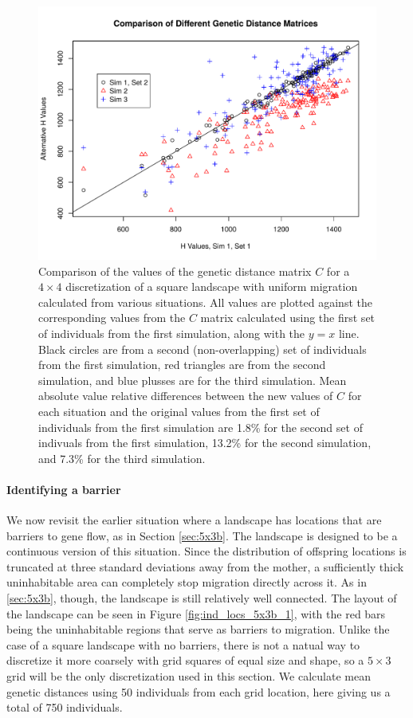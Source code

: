 \documentclass{article}
\begin{document}
\begin{figure}
\centering
\includegraphics[scale=.8]{figs/h_val_comp}
\caption{
    Comparison of the values of the genetic distance matrix $C$
    for a $4 \times 4$ discretization of a square landscape with uniform migration
    calculated from various situations.
    All values are plotted against the corresponding values from the $C$ matrix
    calculated using the first set of individuals from the first simulation,
    along with the $y=x$ line.
    Black circles are from a second (non-overlapping) set of individuals from the first simulation,
    red triangles are from the second simulation, 
    and blue plusses are for the third simulation.
    Mean absolute value relative differences between the new values of $C$ for each situation
    and the original values from the first set of individuals from the first simulation are
    1.8\% for the second set of indivuals from the first simulation,
    13.2\% for the second simulation, 
    and 7.3\% for the third simulation.
    } \label{fig:h_val_comp}
\end{figure}

\paragraph{Identifying a barrier}
We now revisit the earlier situation where a landscape has locations that are barriers to gene flow,
as in Section \ref{sec:5x3b}.
The landscape is designed to be a continuous version of this situation.
Since the distribution of offspring locations is truncated at three standard deviations
away from the mother, a sufficiently thick uninhabitable area can completely stop migration
directly across it.
As in \ref{sec:5x3b}, though, the landscape is still relatively well connected.
The layout of the landscape can be seen in Figure \ref{fig:ind_locs_5x3b_1},
with the red bars being the uninhabitable regions that serve as barriers to migration.
Unlike the case of a square landscape with no barriers, 
there is not a natual way to discretize it more coarsely 
with grid squares of equal size and shape,
so a $5 \times 3$ grid will be the only discretization used in this section.
We calculate mean genetic distances using 50 individuals 
from each grid location,
here giving us a total of 750 individuals.
\end{document}
